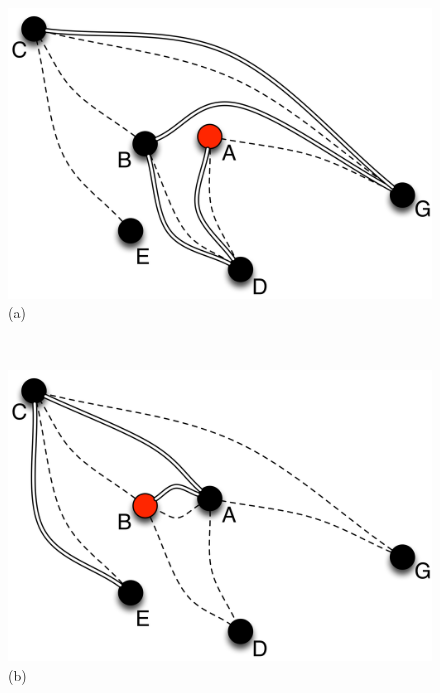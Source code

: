 \begin{figure}[ht]
  {
    \begin{center}{
	\begin{minipage}{.3\linewidth}
	  \begin{center}
	    \includegraphics[width=1.05\linewidth]{Figures/learning1.png}\\(a)
	  \end{center}
	\end{minipage}
	~
	\begin{minipage}{.3\linewidth}
	  \begin{center}
	    \includegraphics[width=1.05\linewidth]{Figures/learning2.png}\\(b)
	  \end{center}
	\end{minipage}
        ~
	\begin{minipage}{.3\linewidth}

\end{minipage}}
\end{center}}
\end{figure}
